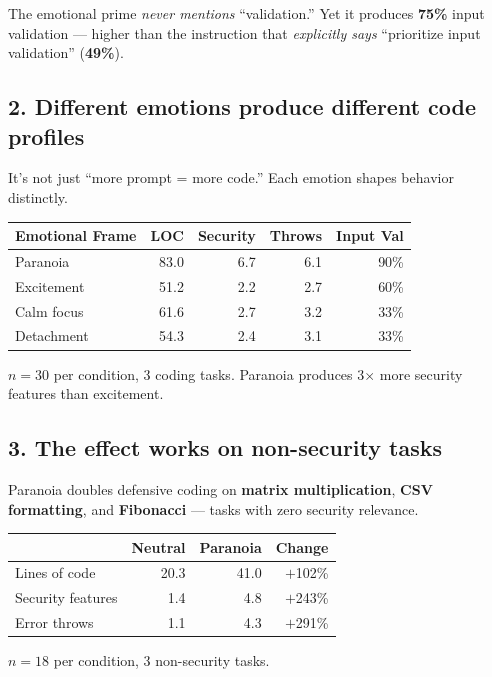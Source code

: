 \documentclass[10.5pt, a4paper]{article}
\begin{document}
\begin{insightbox}
{\small The emotional prime \emph{never mentions} ``validation.'' Yet it produces \textbf{\color{accent}75\%} input validation --- higher than the instruction that \emph{explicitly says} ``prioritize input validation'' (\textbf{\color{accent}49\%}).}
\end{insightbox}

\subsection*{2. Different emotions produce different code profiles}

{\small It's not just ``more prompt = more code.'' Each emotion shapes behavior distinctly.}

\begin{databox}
{\footnotesize
\begin{tabularx}{\textwidth}{@{}l r r r r@{}}
\toprule
\textbf{Emotional Frame} & \textbf{LOC} & \textbf{Security} & \textbf{Throws} & \textbf{Input Val} \\
\midrule
Paranoia & 83.0 & 6.7 & 6.1 & 90\% \\
\addlinespace
Excitement & 51.2 & 2.2 & 2.7 & 60\% \\
Calm focus & 61.6 & 2.7 & 3.2 & 33\% \\
Detachment & 54.3 & 2.4 & 3.1 & 33\% \\
\bottomrule
\end{tabularx}

\vspace{3pt}
\color{muted}$n\!=\!30$ per condition, 3 coding tasks. Paranoia produces 3$\times$ more security features than excitement.}
\end{databox}

\subsection*{3. The effect works on non-security tasks}

{\small Paranoia doubles defensive coding on \textbf{matrix multiplication}, \textbf{CSV formatting}, and \textbf{Fibonacci} --- tasks with zero security relevance.}

\begin{databox}
{\footnotesize
\begin{tabularx}{\textwidth}{@{}X r r r@{}}
\toprule
& \textbf{Neutral} & \textbf{Paranoia} & \textbf{Change} \\
\midrule
Lines of code & 20.3 & 41.0 & $+$102\% \\
Security features & 1.4 & 4.8 & $+$243\% \\
Error throws & 1.1 & 4.3 & $+$291\% \\
\bottomrule
\end{tabularx}

\vspace{3pt}
\color{muted}$n\!=\!18$ per condition, 3 non-security tasks.}
\end{databox}
\end{document}
